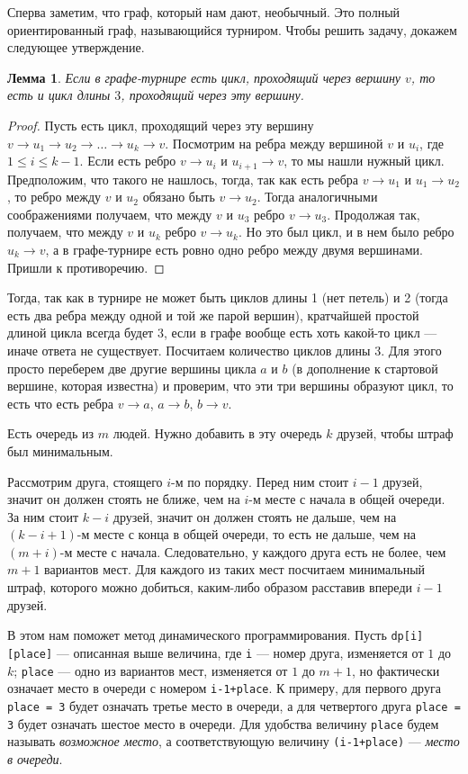 \documentclass[12pt]{article}
\newtheorem*{lemma}{Лемма}
\theoremstyle{definition}
\begin{document}
Сперва заметим, что граф, который нам дают, необычный. Это полный ориентированный граф, называющийся турниром.
Чтобы решить задачу, докажем следующее утверждение. 
\begin{lemma}
Если в графе-турнире есть цикл, проходящий через вершину $v$, то есть и цикл длины $3$, проходящий через эту вершину.
\end{lemma}
\begin{proof}
Пусть есть цикл, проходящий через эту вершину $v \to u_1 \to u_2 \to \ldots \to u_k \to v$. Посмотрим на ребра между вершиной $v$ и $u_i$, где $1 \le i \le k - 1$. Если есть ребро $v \to u_i$ и $u_{i + 1} \to v$, то мы нашли нужный цикл. Предположим, что такого не нашлось, тогда, так как есть ребра $v \to u_1$ и $u_1 \to u_2$, то ребро между $v$ и $u_2$ обязано быть $v \to u_2$. Тогда аналогичными соображениями получаем, что между $v$ и $u_3$ ребро $v \to u_3$. Продолжая так, получаем, что между $v$ и $u_k$ ребро $v \to u_k$. Но это был цикл, и в нем было ребро $u_k \to v$, а в графе-турнире есть ровно одно ребро между двумя вершинами. Пришли к противоречию. 
\end{proof}
Тогда, так как в турнире не может быть циклов длины 1 (нет петель) и 2 (тогда есть два ребра между одной и той же парой вершин), кратчайшей простой длиной цикла всегда будет $3$, если в графе вообще есть хоть какой-то цикл --- иначе ответа не существует. Посчитаем количество циклов длины $3$. Для этого просто переберем две другие вершины цикла $a$ и $b$ (в дополнение к стартовой вершине, которая известна) и проверим, что эти три вершины образуют цикл, то есть что есть ребра $v \to a$, $a \to b$, $b \to v$. 

\pagebreak

Есть очередь из $m$ людей. Нужно добавить в эту очередь $k$ друзей, чтобы штраф был минимальным.

Рассмотрим друга, стоящего $i$-м по порядку. Перед ним стоит $i-1$ друзей, значит он должен стоять не ближе, чем на $i$-м месте с начала в общей очереди. За ним стоит $k-i$ друзей, значит он должен стоять не дальше, чем на $(k-i+1)$-м месте с конца в общей очереди, то есть не дальше, чем на $(m+i)$-м месте с начала. Следовательно, у каждого друга есть не более, чем $m+1$ вариантов мест. Для каждого из таких мест посчитаем минимальный штраф, которого можно добиться, каким-либо образом расставив впереди $i-1$ друзей.

В этом нам поможет метод динамического программирования. Пусть \texttt{dp[i][place]} --- описанная выше величина, где \texttt{i} --- номер друга, изменяется от $1$ до $k$; 
\texttt{place} --- одно из вариантов мест, изменяется от $1$ до $m+1$, но фактически означает место в очереди с номером \texttt{i-1+place}. К примеру, для первого друга \texttt{place = 3} будет означать третье место в очереди, а для четвертого друга \texttt{place = 3} будет означать шестое место в очереди. Для удобства величину \texttt{place} будем называть \textit{возможное место}, а соответствующую величину \texttt{(i-1+place)} --- \textit{место в очереди}.
\end{document}

